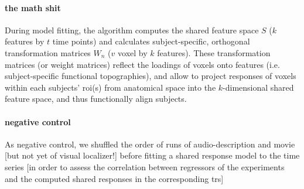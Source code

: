 %
%


\paragraph{the math shit}


%
During model fitting, the algorithm computes the shared feature space $S$ ($k$
features by $t$ time points) and calculates subject-specific, orthogonal
transformation matrices $W_{n}$ ($v$ voxel by $k$ features).
%
These transformation matrices (or weight matrices) reflect the loadings of
voxels onto features (i.e. subject-specific functional topographies), and allow
to project responses of voxels within each subjects' \ac{roi}(s) from anatomical
space into the $k$-dimensional shared feature space, and thus functionally align
subjects.


\paragraph{negative control}



As negative control, we shuffled the order of runs of audio-description and
movie [but not yet of visual localizer!] before fitting a shared response model
to the time series [in order to assess the correlation between regressors of the
experiments and the computed shared responses in the corresponding \acp{tr}]


